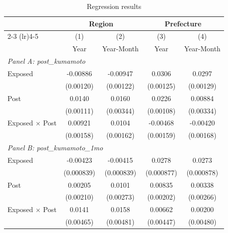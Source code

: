 \begin{table}[htbp]
\centering
\scriptsize
\setlength{\tabcolsep}{4pt}
\renewcommand{\arraystretch}{1.05}

\caption{Regression results}
\label{tab:regression}

\begin{tabular}{l*{4}{c}}
\toprule

& \multicolumn{2}{c}{Region}
& \multicolumn{2}{c}{Prefecture}
\\
\cmidrule(lr){2-3}
\cmidrule(lr){4-5}

& (1) & (2) & (3) & (4)\\
& Year & Year-Month & Year & Year-Month\\

\midrule


\multicolumn{5}{l}{\textit{Panel A: post\_kumamoto}}\\

Exposed
& -0.00886\sym{***}
& -0.00947\sym{***}
& 0.0306\sym{***}
& 0.0297\sym{***}
\\
& (0.00120)&(0.00122)&(0.00125)&(0.00129)
\\

Post
&0.0140\sym{***}
&0.0160\sym{***}
&0.0226\sym{***}
&0.00884\sym{***}
\\
&(0.00111)&(0.00344)&(0.00108)&(0.00334)
\\

Exposed $\times$ Post
&0.00921\sym{***}
&0.0104\sym{***}
&-0.00468\sym{***}
&-0.00420\sym{**}
\\
&(0.00158)&(0.00162)&(0.00159)&(0.00168)

\\[0.1cm]
\midrule


\multicolumn{5}{l}{\textit{Panel B: post\_kumamoto\_1mo}}\\

Exposed
&-0.00423\sym{***}
&-0.00415\sym{***}
&0.0278\sym{***}
&0.0273\sym{***}
\\
&(0.000839)&(0.000839)&(0.000877)&(0.000878)
\\

Post
&0.00205
&0.0101\sym{***}
&0.00835\sym{***}
&0.00338
\\
&(0.00210)&(0.00273)&(0.00202)&(0.00266)
\\

Exposed $\times$ Post
&0.0141\sym{***}
&0.0158\sym{***}
&0.00662
&0.00200
\\
&(0.00465)&(0.00481)&(0.00447)&(0.00480)

\\[0.1cm]
\midrule



\end{tabular}
\end{table}
